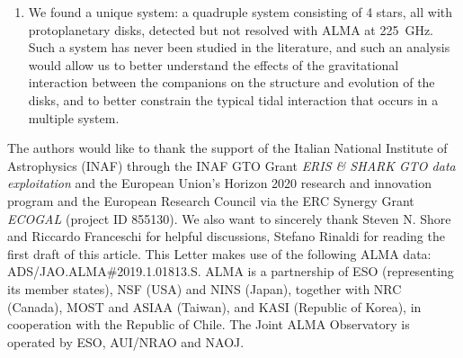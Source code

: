 \documentclass{aa}
\begin{document}
\begin{enumerate}
    \item We found a unique system: a quadruple system consisting of 4 stars, all with protoplanetary disks, detected but not resolved with ALMA at 225~GHz. Such a system has never been studied in the literature, and such an analysis would allow us to better understand the effects of the gravitational interaction between the companions on the structure and evolution of the disks, and to better constrain the typical tidal interaction that occurs in a multiple system.
\end{enumerate}

\begin{acknowledgements}
    The authors would like to thank the support of the Italian National Institute of Astrophysics (INAF) through the INAF GTO Grant \textit{ERIS \& SHARK GTO data exploitation} and the European Union's Horizon 2020 research and innovation program and the European Research Council via the ERC Synergy Grant \textit{ECOGAL} (project ID 855130). We also want to sincerely thank Steven N. Shore and Riccardo Franceschi for helpful discussions, Stefano Rinaldi for reading the first draft of this article. This Letter makes use of the following ALMA data: ADS/JAO.ALMA$\#$2019.1.01813.S. ALMA is a partnership of ESO (representing its member states), NSF (USA) and NINS (Japan), together with NRC (Canada), MOST and ASIAA (Taiwan), and KASI (Republic of Korea), in cooperation with the Republic of Chile. The Joint ALMA Observatory is operated by ESO, AUI/NRAO and NAOJ.
\end{acknowledgements}



\end{document}

